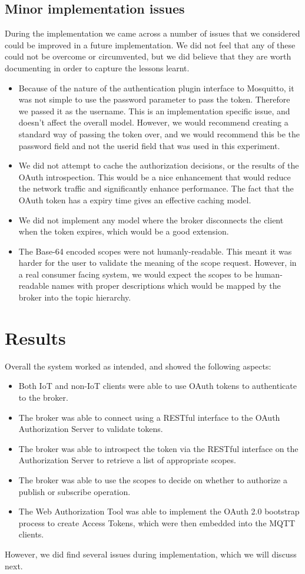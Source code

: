 \documentclass{llncs}
\begin{document}
\subsection{Minor implementation issues} 
During the implementation we came across a number of issues that we considered could be improved 
in a future implementation. We did not feel that any of these could not be overcome or 
circumvented, but we did believe that they are worth documenting in order to capture the lessons learnt.
\begin{itemize}
\item Because of the nature of the authentication plugin interface to Mosquitto, it was not simple 
to use the password parameter to pass the token. Therefore we passed it as the username. 
This is an implementation specific issue, and doesn't affect the overall model. However, we would recommend creating a standard
way of passing the token over, and we would recommend this be the password field and not the userid field that was used in this experiment.
\item We did not attempt to cache the authorization decisions, or the results of the OAuth introspection.
This would be a nice enhancement that would reduce the network traffic and significantly enhance performance. 
The fact that the OAuth token has a expiry time gives an effective caching model.
\item We did not implement any model where the broker disconnects the client when the token expires, which 
would be a good extension.
\item The Base-64 encoded scopes were not humanly-readable. This meant it was harder for the user to validate the meaning of the scope request. However, in a real 
consumer facing system, we would expect the scopes to be human-readable names with proper descriptions which would be mapped by the broker into the topic hierarchy.
\end{itemize}
\fi

\section{Results}\label{sect:results}
Overall the system worked as intended, and showed the following aspects:
\begin{itemize}
\item Both IoT and non-IoT clients were able to use OAuth tokens to authenticate to the broker.
\item The broker was able to connect using a RESTful interface to the OAuth Authorization Server 
to validate tokens.
\item The broker was able to introspect the token via the RESTful interface on the Authorization Server
to retrieve a list of appropriate scopes.
\item The broker was able to use the scopes to decide on whether to authorize a publish or 
subscribe operation.
\item The Web Authorization Tool was able to implement the OAuth 2.0 bootstrap process to create Access
Tokens, which were then embedded into the MQTT clients.
\end{itemize}
However, we did find several issues during implementation, which we will discuss next.
\end{document}
